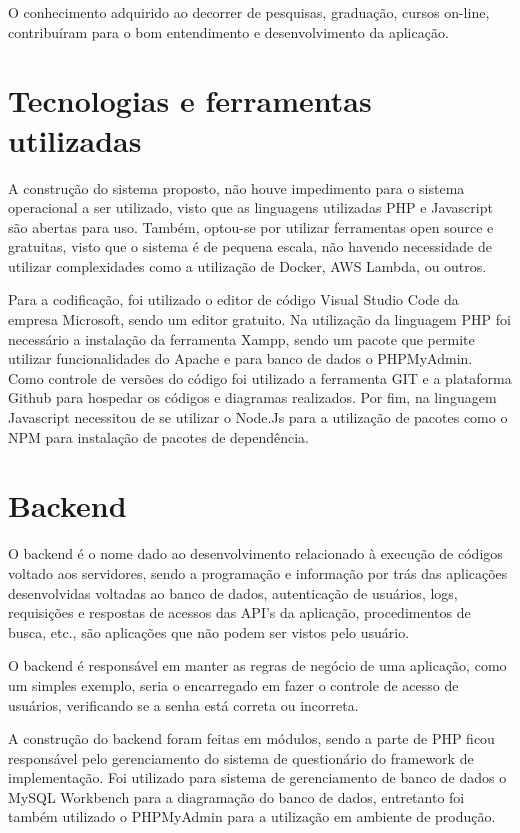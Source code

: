 \documentclass[
	12pt,				%
	openright,			%
	oneside,			%
	a4paper,			%
	english,			%
	french,				%
	spanish,			%
	brazil,				%
	]{abntex2}
\begin{document}
O conhecimento adquirido ao decorrer de pesquisas, graduação, cursos on-line, contribuíram para o bom entendimento e desenvolvimento da aplicação.


\section{Tecnologias e ferramentas utilizadas}

A construção do sistema proposto, não houve impedimento para o sistema operacional a ser utilizado, visto que as linguagens utilizadas PHP e Javascript são abertas para uso. Também, optou-se por utilizar ferramentas open source e gratuitas, visto que o sistema é de pequena escala, não havendo necessidade de utilizar complexidades como a utilização de Docker, AWS Lambda, ou outros.

Para a codificação, foi utilizado o editor de código Visual Studio Code da empresa Microsoft, sendo um editor gratuito. Na utilização da linguagem PHP foi necessário a instalação da ferramenta Xampp, sendo um pacote que permite utilizar funcionalidades do Apache e para banco de dados o PHPMyAdmin. Como controle de versões do código foi utilizado a ferramenta GIT e a plataforma Github para hospedar os códigos e diagramas realizados. Por fim, na linguagem Javascript necessitou de se utilizar o Node.Js para a utilização de pacotes como o NPM para instalação de pacotes de dependência.  

\section{Backend}

O backend é o nome dado ao desenvolvimento relacionado à execução de códigos voltado aos servidores, sendo a programação e informação por trás das aplicações desenvolvidas voltadas ao banco de dados, autenticação de usuários, logs, requisições e respostas de acessos das API’s da aplicação, procedimentos de busca, etc., são aplicações que não podem ser vistos pelo usuário.

O backend é responsável em manter as regras de negócio de uma aplicação, como um simples exemplo, seria o encarregado em fazer o controle de acesso de usuários, verificando se a senha está correta ou incorreta.

A construção do backend foram feitas em módulos, sendo a parte de PHP ficou responsável pelo gerenciamento do sistema de questionário do framework de implementação. Foi utilizado para sistema de gerenciamento de banco de dados o MySQL Workbench para a diagramação do banco de dados, entretanto foi também utilizado o PHPMyAdmin para a utilização em ambiente de produção.
\end{document}
